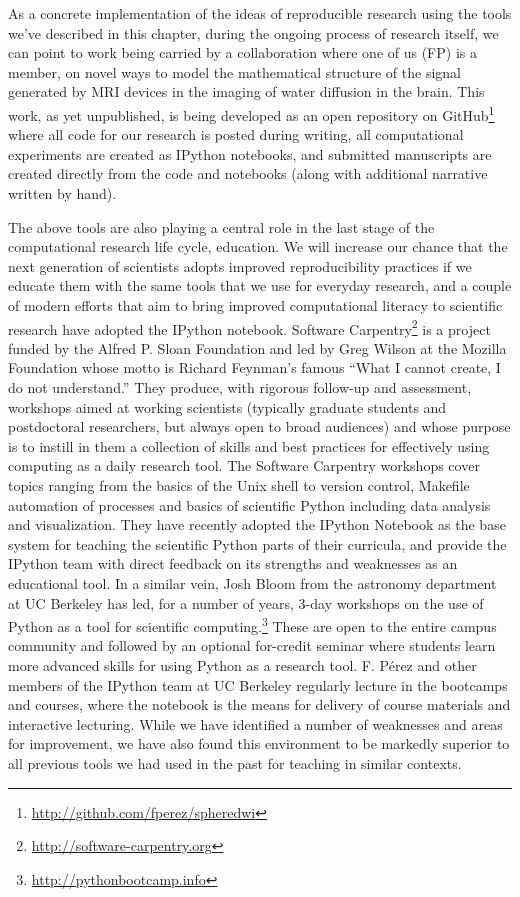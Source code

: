 \documentclass[11pt,oneside,english]{article}
\begin{document}
As a concrete implementation of the ideas of reproducible research using the
tools we've described in this chapter, during the ongoing process of research
itself, we can point to work being carried by a collaboration where one of us
(FP) is a member, on novel ways to model the mathematical structure of the
signal generated by MRI devices in the imaging of water diffusion in the
brain.  This work, as yet unpublished, is being developed as an open repository
on GitHub\footnote{\url{http://github.com/fperez/spheredwi}} where all code
for our research is posted during writing, all computational experiments are
created as IPython notebooks, and submitted manuscripts are created directly
from the code and notebooks (along with additional narrative written by hand).

The above tools are also playing a central role in the last stage of the
computational research life cycle, education.  We will increase our chance that
the next generation of scientists adopts improved reproducibility practices if
we educate them with the same tools that we use for everyday research, and a
couple of modern efforts that aim to bring improved computational literacy to
scientific research have adopted the IPython notebook.  Software
Carpentry\footnote{\url{http://software-carpentry.org}} is a project funded by
the Alfred P. Sloan Foundation and led by Greg Wilson at the Mozilla Foundation
whose motto is Richard Feynman's famous ``What I cannot create, I do not
understand.''  They produce, with rigorous follow-up and assessment, workshops
aimed at working scientists (typically graduate students and postdoctoral
researchers, but always open to broad audiences) and whose purpose is to
instill in them a collection of skills and best practices for effectively using
computing as a daily research tool.  The Software Carpentry workshops cover
topics ranging from the basics of the Unix shell to version control, Makefile
automation of processes and basics of scientific Python including data analysis
and visualization.  They have recently adopted the IPython Notebook as the base
system for teaching the scientific Python parts of their curricula, and provide
the IPython team with direct feedback on its strengths and weaknesses as an
educational tool.  In a similar vein, Josh Bloom from the astronomy department
at UC Berkeley has led, for a number of years, 3-day workshops on the use of
Python as a tool for scientific
computing.\footnote{\url{http://pythonbootcamp.info}}  These are open to the
entire campus community and followed by an optional for-credit seminar where
students learn more advanced skills for using Python as a research tool.  F.
Pérez and other members of the IPython team at UC Berkeley regularly lecture in
the bootcamps and courses, where the notebook is the means for delivery of
course materials and interactive lecturing.  While we have identified a number
of weaknesses and areas for improvement, we have also found this environment to
be markedly superior to all previous tools we had used in the past for teaching
in similar contexts.
\end{document}

